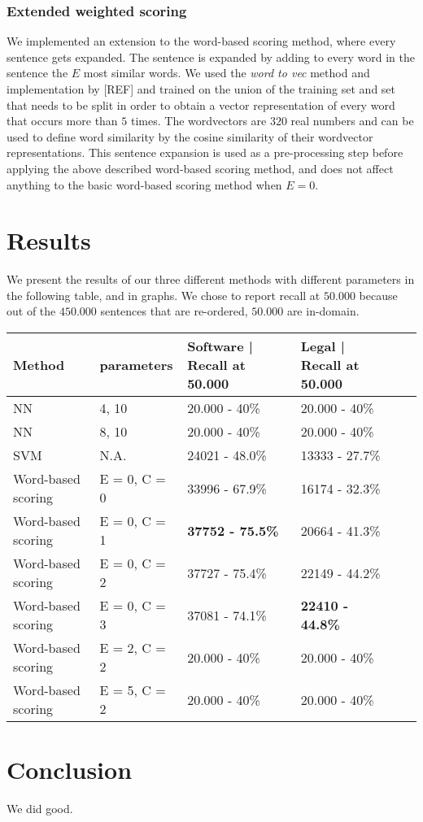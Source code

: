 \documentclass[11pt]{article}
\begin{document}
\subsubsection{Extended weighted scoring}
We implemented an extension to the word-based scoring method, where every sentence gets expanded. The sentence is expanded by adding to every word in the sentence the $E$ most similar words. We used the \textit{word to vec} method and implementation by [REF] and trained on the union of the training set and set that needs to be split in order to obtain a vector representation of every word that occurs more than $5$ times. The wordvectors are $320$ real numbers and can be used to define word similarity by the cosine similarity of their wordvector representations. 
This sentence expansion is used as a pre-processing step before applying the above described word-based scoring method, and does not affect anything to the basic word-based scoring method when $E = 0$.

\section{Results}
\label{sec:results}
We present the results of our three different methods with different parameters in the following table, and in graphs. We chose to report recall at $50.000$ because out of the $450.000$ sentences that are re-ordered, $50.000$ are in-domain. 

\begin{table}[H]
    \begin{tabular}{|l|l|l|l|l|l|}
    \hline
    Method & parameters & Software | Recall at 50.000  & Legal | Recall at 50.000 \\ \hline
    NN      & 4, 10          & 20.000 - 40\%  & 20.000 - 40\%        \\ \hline
    NN      & 8, 10          & 20.000 - 40\%  & 20.000 - 40\%        \\ \hline
    SVM      & N.A.          & 24021 - 48.0\%  & 13333 - 27.7\%        \\ \hline
    Word-based scoring  & E = 0, C = 0 & 33996 - 67.9\%  & 16174 - 32.3\%        \\ \hline
    Word-based scoring  & E = 0, C = 1 & \textbf{37752 - 75.5\%}  & 20664 - 41.3\%        \\ \hline
    Word-based scoring  & E = 0, C = 2 & 37727 - 75.4\%  & 22149 - 44.2\%        \\ \hline
    Word-based scoring  & E = 0, C = 3 & 37081 - 74.1\%  & \textbf{22410 - 44.8\%}        \\ \hline
    Word-based scoring  & E = 2, C = 2 & 20.000 - 40\%  & 20.000 - 40\%        \\ \hline
    Word-based scoring  & E = 5, C = 2 & 20.000 - 40\%  & 20.000 - 40\%        \\ \hline
    \end{tabular}
\end{table}






\section{Conclusion}
\label{sec:conclusion}
We did good.




\end{document}
